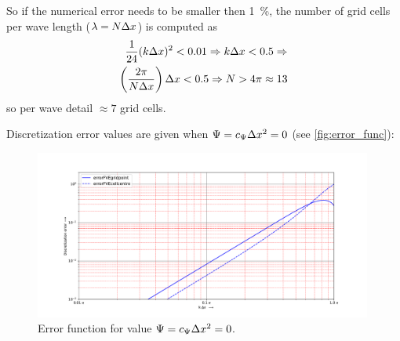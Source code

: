 So if the numerical error needs to be smaller then 1\ \%, the number of grid cells per wave length ($\lambda = N\Delta x$) is computed as
\begin{align}
\frac{1}{24}(k\Delta x)^2 < 0.01 \Rightarrow k\Delta x < 0.5 \Rightarrow
\\
\left(\frac{2\pi}{N\Delta x}\right)\Delta x < 0.5 \Rightarrow N > 4\pi \approx 13
\end{align}
so per wave detail $\approx 7$ grid cells.

Discretization error values are given when  $\Psi = c_{\Psi}\Delta x^2 = 0$ (see \autoref{fig:error_func}):
\begin{figure}[H]
\centering
\includegraphics[width=0.99\textwidth]{figures/discr_error_u_u_giv.pdf}
\caption{Error function for value $\Psi = c_{\Psi}\Delta x^2 = 0$. \label{fig:error_func}}
\end{figure}

